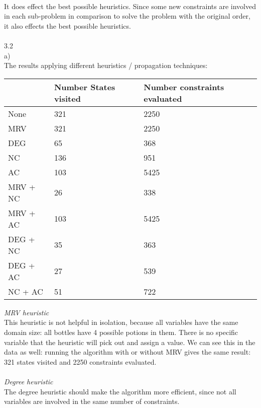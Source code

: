 \documentclass{article}
\begin{document}
\\
It does effect the best possible heuristics. Since some new constraints are involved in each sub-problem in comparison to solve the problem with the original order, it also effects the best possible heuristics.\\
\\
3.2
\\
a)
\\
The results applying different heuristics / propagation techniques:
\begin{center}
\begin{tabular}{|l|l|l|}
\hline
         & Number States visited & Number constraints evaluated \\ \hline
None     & 321                   & 2250                         \\ \hline
MRV      & 321                   & 2250                         \\ \hline
DEG      & 65                    & 368                          \\ \hline
NC       & 136                   & 951                          \\ \hline
AC       & 103                   & 5425                         \\ \hline
MRV + NC & 26                    & 338                          \\ \hline
MRV + AC & 103                   & 5425                         \\ \hline
DEG + NC & 35                    & 363                          \\ \hline
DEG + AC & 27                    & 539                          \\ \hline
NC + AC  & 51                    & 722                          \\ \hline
\end{tabular}
\end{center}
\textit{MRV heuristic}\\
This heuristic is not helpful in isolation, because all variables have the same domain size: all bottles have 4 possible potions in them. There is no specific variable that the heuristic will pick out and assign a value. We can see this in the data as well: running the algorithm with or without MRV gives the same result: 321 states visited and 2250 constraints evaluated. \\
\\
\textit{Degree heuristic}\\
The degree heuristic should make the algorithm more efficient, since not all variables are involved in the same number of constraints. \\
\end{document}
